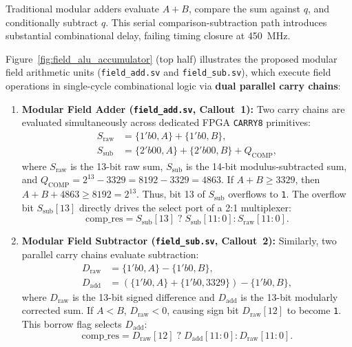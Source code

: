 Traditional modular adders evaluate $A + B$, compare the sum against $q$, and conditionally subtract $q$. This serial comparison-subtraction path introduces substantial combinational delay, failing timing closure at 450~MHz.

Figure~\ref{fig:field_alu_accumulator} (top half) illustrates the proposed modular field arithmetic units (\texttt{field\_add.sv} and \texttt{field\_sub.sv}), which execute field operations in single-cycle combinational logic via \textbf{dual parallel carry chains}:
\begin{enumerate}
    \item \textbf{Modular Field Adder (\texttt{field\_add.sv}, Callout~1):}
    Two carry chains are evaluated simultaneously across dedicated FPGA \texttt{CARRY8} primitives:
    \begin{align}
    S_{\text{raw}} &= \{1'b0, A\} + \{1'b0, B\}, \label{eq:add_chain1_sec5b} \\
    S_{\text{sub}} &= \{2'b00, A\} + \{2'b00, B\} + Q_{\text{COMP}}, \label{eq:add_chain2_sec5b}
    \end{align}
    where $S_{\text{raw}}$ is the 13-bit raw sum, $S_{\text{sub}}$ is the 14-bit modulus-subtracted sum, and $Q_{\text{COMP}} = 2^{13} - 3329 = 8192 - 3329 = 4863$. If $A + B \ge 3329$, then $A + B + 4863 \ge 8192 = 2^{13}$. Thus, bit 13 of $S_{\text{sub}}$ overflows to \texttt{1}. The overflow bit $S_{\text{sub}}[13]$ directly drives the select port of a 2:1 multiplexer:
    \begin{equation}
    \text{comp\_res} = S_{\text{sub}}[13] \;?\; S_{\text{sub}}[11:0] : S_{\text{raw}}[11:0].
    \end{equation}

    \item \textbf{Modular Field Subtractor (\texttt{field\_sub.sv}, Callout~2):}
    Similarly, two parallel carry chains evaluate subtraction:
    \begin{align}
    D_{\text{raw}} &= \{1'b0, A\} - \{1'b0, B\}, \label{eq:sub_chain1_sec5b} \\
    D_{\text{add}} &= (\{1'b0, A\} + \{1'b0, 3329\}) - \{1'b0, B\}, \label{eq:sub_chain2_sec5b}
    \end{align}
    where $D_{\text{raw}}$ is the 13-bit signed difference and $D_{\text{add}}$ is the 13-bit modularly corrected sum. If $A < B$, $D_{\text{raw}} < 0$, causing sign bit $D_{\text{raw}}[12]$ to become \texttt{1}. This borrow flag selects $D_{\text{add}}$:
    \begin{equation}
    \text{comp\_res} = D_{\text{raw}}[12] \;?\; D_{\text{add}}[11:0] : D_{\text{raw}}[11:0].
    \end{equation}
\end{enumerate}

